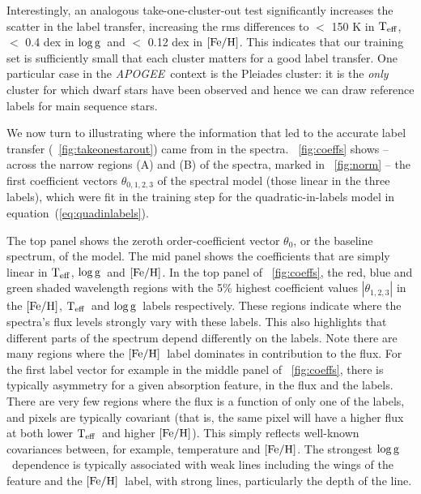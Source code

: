 \documentclass[12pt, preprint]{aastex}
\newcommand{\apogee}{\textsl{APOGEE}}
\newcommand{\teff}{\mbox{$\rm T_{eff}$}}
\newcommand{\feh}{\mbox{$\rm [Fe/H]$}}
\newcommand{\logg}{\mbox{$\rm \log g$}}
\begin{document}
Interestingly, an analogous take-one-cluster-out test significantly increases the scatter in the label transfer, 
increasing the rms differences to $<$ 150 K in \teff, $<$ 0.4 dex in \logg\ and $<$ 0.12 dex in \feh.
This indicates that our training set is sufficiently small that each cluster matters for a good label transfer. 
One particular case in the \apogee\ context is the Pleiades cluster: it is the \textit{only} cluster for which dwarf stars have been observed and hence we can draw reference labels for main sequence stars. 
 
We now turn to illustrating where the information that led to the accurate label transfer (\figurename~\ref{fig:takeonestarout}) came from in the spectra.
\figurename~\ref{fig:coeffs} shows -- across the narrow regions (A) and (B) of the spectra, marked in \figurename~\ref{fig:norm} -- the first coefficient vectors $\theta_{0,1,2,3}$ of the spectral model (those linear in the three labels), which were fit in the training step for the quadratic-in-labels model in equation~(\ref{eq:quadinlabels}). 


The top panel shows the zeroth order-coefficient vector $\theta_0$, or the baseline spectrum, of the model. 
The mid panel shows the coefficients that are simply linear in \teff, \logg\ and \feh.
In the top panel of \figurename~\ref{fig:coeffs}, the red, blue and green shaded wavelength regions with the 5\% 
highest coefficient values $|\theta_{1,2,3}|$ in the \feh, \teff\ and \logg\ labels respectively. 
These regions indicate where the spectra's flux levels strongly vary with these labels.
This also highlights that different parts of the spectrum depend differently on the labels. Note there are many regions where the \feh\ label dominates in contribution to the flux.
For the first label vector for example in the middle panel of \figurename~\ref{fig:coeffs}, 
there is typically asymmetry for a given absorption feature, in the flux and the labels. 
There are very few regions where the flux is a function of only one of the labels, and pixels are typically covariant 
(that is, the same pixel will have a higher flux at both lower \teff\ and higher \feh). 
This simply reflects well-known covariances between, for example, temperature and \feh .
The strongest \logg\ dependence is typically associated with weak lines including the wings of the 
feature and the \feh\ label, with strong lines, particularly the depth of the line. 
\end{document}
